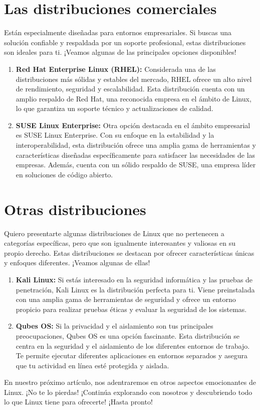 \documentclass[
  a4paper,
]{article}
\begin{document}
\hypertarget{las-distribuciones-comerciales}{%
\section{Las distribuciones
comerciales}\label{las-distribuciones-comerciales}}

Están especialmente diseñadas para entornos empresariales. Si buscas una
solución confiable y respaldada por un soporte profesional, estas
distribuciones son ideales para ti. ¡Veamos algunas de las principales
opciones disponibles!

\begin{enumerate}
\def\labelenumi{\arabic{enumi}.}
\item
  \textbf{Red Hat Enterprise Linux (RHEL):} Considerada una de las
  distribuciones más sólidas y estables del mercado, RHEL ofrece un alto
  nivel de rendimiento, seguridad y escalabilidad. Esta distribución
  cuenta con un amplio respaldo de Red Hat, una reconocida empresa en el
  ámbito de Linux, lo que garantiza un soporte técnico y actualizaciones
  de calidad.
\item
  \textbf{SUSE Linux Enterprise:} Otra opción destacada en el ámbito
  empresarial es SUSE Linux Enterprise. Con su enfoque en la estabilidad
  y la interoperabilidad, esta distribución ofrece una amplia gama de
  herramientas y características diseñadas específicamente para
  satisfacer las necesidades de las empresas. Además, cuenta con un
  sólido respaldo de SUSE, una empresa líder en soluciones de código
  abierto.
\end{enumerate}

\hypertarget{otras-distribuciones}{%
\section{Otras distribuciones}\label{otras-distribuciones}}

Quiero presentarte algunas distribuciones de Linux que no pertenecen a
categorías específicas, pero que son igualmente interesantes y valiosas
en su propio derecho. Estas distribuciones se destacan por ofrecer
características únicas y enfoques diferentes. ¡Veamos algunas de ellas!

\begin{enumerate}
\def\labelenumi{\arabic{enumi}.}
\item
  \textbf{Kali Linux:} Si estás interesado en la seguridad informática y
  las pruebas de penetración, Kali Linux es la distribución perfecta
  para ti. Viene preinstalada con una amplia gama de herramientas de
  seguridad y ofrece un entorno propicio para realizar pruebas éticas y
  evaluar la seguridad de los sistemas.
\item
  \textbf{Qubes OS:} Si la privacidad y el aislamiento son tus
  principales preocupaciones, Qubes OS es una opción fascinante. Esta
  distribución se centra en la seguridad y el aislamiento de los
  diferentes entornos de trabajo. Te permite ejecutar diferentes
  aplicaciones en entornos separados y asegura que tu actividad en línea
  esté protegida y aislada.
\end{enumerate}

En nuestro próximo artículo, nos adentraremos en otros aspectos
emocionantes de Linux. ¡No te lo pierdas! ¡Continúa explorando con
nosotros y descubriendo todo lo que Linux tiene para ofrecerte! ¡Hasta
pronto!


\printbibliography
\end{document}
